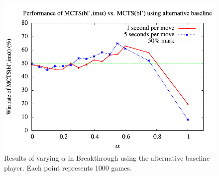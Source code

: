 \documentclass[conference]{IEEEtran}
\begin{document}
\begin{figure}[t]
\begin{center}
\includegraphics[scale=0.68]{plots/bt-alt-alpha}
\caption{Results of varying $\alpha$ in Breakthrough using the alternative baseline player.
Each point represents 1000 games.} 
\label{fig:bt-alt-alpha}
\end{center}
\end{figure}


\vspace{0.05cm} %

%
\end{document}
